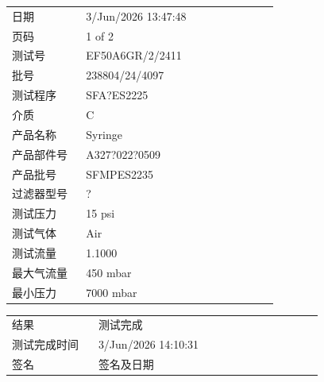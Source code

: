 \documentclass[UTF8,10pt,a4paper,fontset=fandol]{ctexart}
\newcommand{\fieldvalue}[1]{#1}
\newcommand{\handwritten}[1]{#1}
\begin{document}
\begin{tabular}{@{}p{0.25\linewidth}p{0.65\linewidth}@{}}
日期 &
\fieldvalue{3/Jun/2026 13:47:48}
\\
页码 &
\fieldvalue{1 of 2}
\\
测试号 &
\fieldvalue{EF50A6GR/2/2411}
\\
批号 &
\fieldvalue{238804/24/4097}
\\
测试程序 &
\fieldvalue{SFA?ES2225}
\\
介质 &
\fieldvalue{C}
\\
产品名称 &
\fieldvalue{Syringe}
\\
产品部件号 &
\fieldvalue{A327?022?0509}
\\
产品批号 &
\fieldvalue{SFMPES2235}
\\
过滤器型号 &
\fieldvalue{?}
\\
测试压力 &
\fieldvalue{15 psi}
\\
测试气体 &
\fieldvalue{Air}
\\
测试流量 &
\fieldvalue{1.1000}
\\
最大气流量 &
\fieldvalue{450 mbar}
\\
最小压力 &
\fieldvalue{7000 mbar}
\\
\end{tabular}

\vspace{1em}

\begin{tabular}{@{}p{0.25\linewidth}p{0.65\linewidth}@{}}
结果 &
\fieldvalue{测试完成}
\\
测试完成时间 &
\fieldvalue{3/Jun/2026 14:10:31}
\\
签名 &
\fieldvalue{\handwritten{签名及日期}}
\\
\end{tabular}
\end{document}
